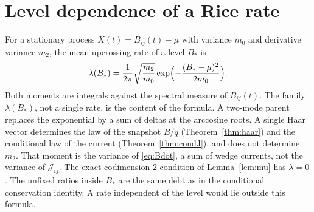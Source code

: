 \section{Level dependence of a Rice rate}
\label{sec:h-hazard}

For a stationary process \(X(t)=B_{ij}(t)-\mu\) with variance \(m_0\) and
derivative variance \(m_2\), the mean upcrossing rate of a level \(B_*\) is
\[
\lambda(B_*)
=\frac{1}{2\pi}\sqrt{\frac{m_2}{m_0}}
\exp\Bigl(-\frac{(B_*-\mu)^2}{2m_0}\Bigr).
\]
Both moments are integrals against the spectral measure of \(B_{ij}(t)\).
The family \(\lambda(B_*)\), not a single rate, is the content of the formula.
A two-mode parent replaces the exponential by a sum of deltas at the
arccosine roots.
A single Haar vector determines the law of the snapshot \(B/q\)
(Theorem~\ref{thm:haar}) and the conditional law of the current
(Theorem~\ref{thm:condJ}), and does not determine \(m_2\).
That moment is the variance of \eqref{eq:Bdot}, a sum of wedge currents,
not the variance of \(\mathcal{J}_{ij}\).
The exact codimension-\(2\) condition of Lemma~\ref{lem:mu} has \(\lambda=0\).
The unfixed ratios inside \(B_*\) are the same debt as in the conditional
conservation identity.
A rate independent of the level would lie outside this formula.
